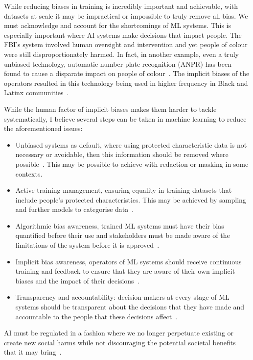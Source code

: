 \documentclass[]{final_report}
\begin{document}
\newpage
While reducing biases in training is incredibly important and achievable, with datasets at scale it may be impractical or impossible to truly remove all bias. We must acknowledge and account for the shortcomings of ML systems. This is especially important where AI systems make decisions that impact people. The FBI's system involved human oversight and intervention and yet people of colour were still disproportionately harmed. In fact, in another example, even a truly unbiased technology, automatic number plate recognition (ANPR) has been found to cause a disparate impact on people of colour~\cite{anprAccountability}. The implicit biases of the operators resulted in this technology being used in higher frequency in Black and Latinx communities~\cite{anprAccountability,facialRecognitionBias}.

While the human factor of implicit biases makes them harder to tackle systematically, I believe several steps can be taken in machine learning to reduce  the aforementioned issues:
\begin{itemize}
  \item Unbiased systems as default, where using protected characteristic data is not necessary or avoidable, then this information should be removed where possible~\cite{AIRisksAndPrinciples}. This may be possible to achieve with redaction or masking in some contexts.
  \item Active training management, ensuring equality in training datasets that include people's protected characteristics. This may be achieved by sampling and further models to categorise data~\cite{AIRisksAndPrinciples}.
  \item Algorithmic bias awareness, trained ML systems must have their bias quantified before their use and stakeholders must be made aware of the limitations of the system before it is approved~\cite{AIRisksAndPrinciples}.
  \item Implicit bias awareness, operators of ML systems should receive continuous training and feedback to ensure that they are aware of their own implicit biases and the impact of their decisions~\cite{facialRecognitionBias}.
  \item Transparency and accountability: decision-makers at every stage of ML systems should be transparent about the decisions that they have made and accountable to the people that these decisions affect~\cite{AIRisksAndPrinciples}.
\end{itemize}
AI must be regulated in a fashion where we no longer perpetuate existing or create new social harms while not discouraging the potential societal benefits that it may bring~\cite{AIRisksAndPrinciples}. 
\end{document}
